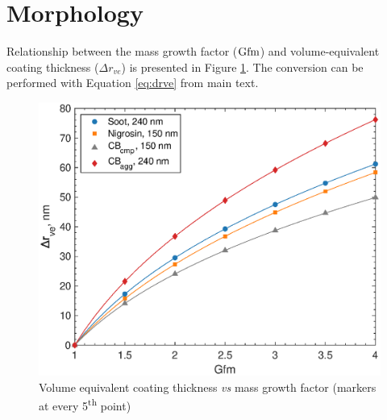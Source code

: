 \documentclass[12pt]{article}
\begin{document}



\section{Morphology}


Relationship between the mass growth factor ($\rm Gfm$) and volume-equivalent coating thickness ($\Delta r_{ve}$) is presented in Figure \ref{s:fig:drve}. The conversion can be performed with Equation \ref{eq:drve} from main text.

\begin{figure}[htp]
\centering
\includegraphics[scale=0.7]{images/fig_supp_drve.eps}
\caption{Volume equivalent coating thickness \textit{vs} mass growth factor (markers at every 5\textsuperscript{th} point)}
\label{s:fig:drve}
\end{figure}
\end{document}
